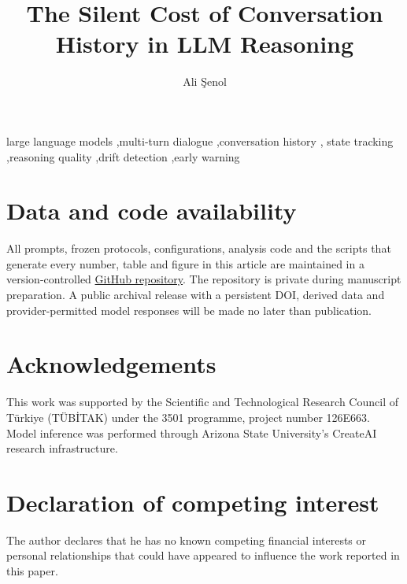 \documentclass[preprint,11pt,authoryear]{elsarticle}
\begin{document}
\begin{frontmatter}

\title{The Silent Cost of Conversation History in LLM Reasoning}

\author[tarsus]{Ali \c{S}enol}

\begin{abstract}

\end{abstract}

\begin{keyword}
large language models \sep multi-turn dialogue \sep conversation history \sep
state tracking \sep reasoning quality \sep drift detection \sep early warning
\end{keyword}

\end{frontmatter}










\section*{Data and code availability}
All prompts, frozen protocols, configurations, analysis code and the scripts
that generate every number, table and figure in this article are maintained in
a version-controlled
\href{https://github.com/senolali/reasoning-monitor-3501}{GitHub repository}.
The repository is private during manuscript preparation. A public archival
release with a persistent DOI, derived data and provider-permitted model
responses will be made no later than publication.

\section*{Acknowledgements}
This work was supported by the Scientific and Technological Research Council of
T\"urkiye (T\"UB\.{I}TAK) under the 3501 programme, project number 126E663.
Model inference was performed through Arizona State University's CreateAI
research infrastructure.

\section*{Declaration of competing interest}
The author declares that he has no known competing financial interests or
personal relationships that could have appeared to influence the work reported
in this paper.
\end{document}
